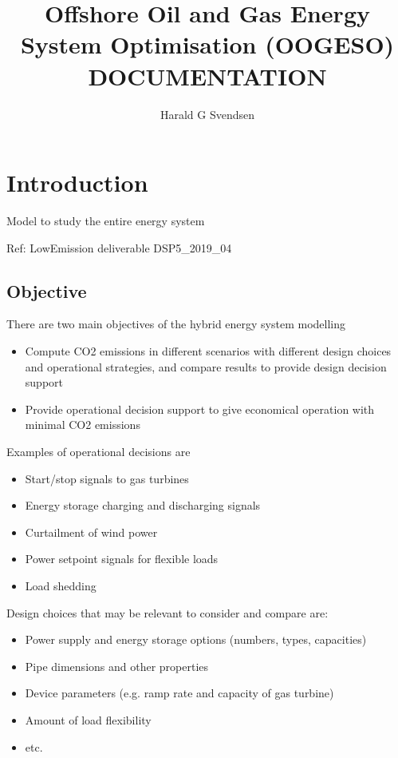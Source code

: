 \documentclass[12pt]{article}
\author{Harald G Svendsen}
\title{Offshore Oil and Gas Energy System Optimisation (OOGESO)\\ \textbf{DOCUMENTATION}}
\begin{document}
\maketitle



\tableofcontents

\newpage


\section{Introduction}
Model to study the entire energy system

Ref: LowEmission deliverable DSP5\_2019\_04


\subsection{Objective}
There are two main objectives of the hybrid energy system modelling
\begin{itemize}
	\item Compute CO2 emissions in different scenarios with different design choices and operational strategies, and compare results to provide design decision support
	\item Provide operational decision support to give economical operation with minimal CO2 emissions
\end{itemize}


\noindent
Examples of operational decisions are
\begin{itemize}
	\item Start/stop signals to gas turbines
	\item Energy storage charging and discharging signals
	\item Curtailment of wind power
	\item Power setpoint signals for flexible loads
	\item Load shedding
\end{itemize}

\noindent
Design choices that may be relevant to consider and compare are:

\begin{itemize}
	\item Power supply and energy storage options (numbers, types, capacities)
	\item Pipe dimensions and other properties
	\item Device parameters (e.g. ramp rate and capacity of gas turbine)
	\item Amount of load flexibility
	\item etc.
\end{itemize}
\end{document}

